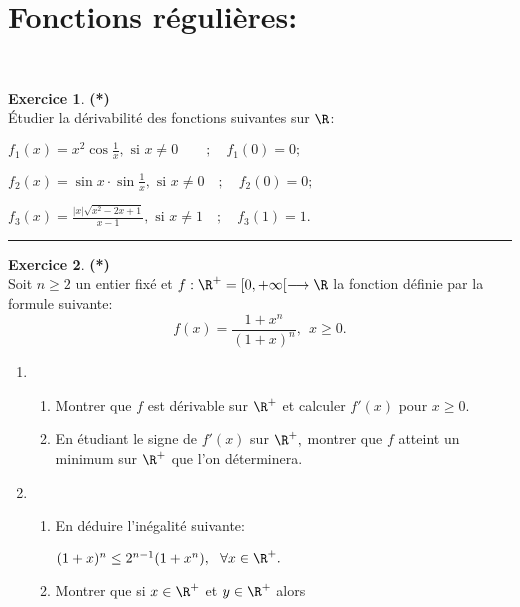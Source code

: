 \documentclass[a4paper,11pt]{article}
\theoremstyle{definition}
\newtheorem{exo}{Exercice} %
\begin{document}
\section*{Fonctions régulières:}\hfill\\%
\begin{minipage}{1\linewidth}
	\begin{minipage}[t]{0.48\linewidth}
		\raggedright
	

\begin{exo}\textbf{(*)}\quad\\[0.2cm]
	\'Etudier la d\'erivabilit\'e des fonctions suivantes sur $\R$:
	
	$f_1(x)=x^2\cos \frac{1}{x}, \text{\ \  si }x\not=0 \qquad ; \quad f_1(0)=0 ;$
	
	$f_2(x)= \sin x \cdot \sin \frac{1}{x}, \text{\ \  si }x\not=0 \quad ; \quad f_2(0)=0 ;$
	
	$f_3(x) = \frac{|x|\sqrt{x^2-2x+1}}{x-1}, \text{\ \  si } x\not= 1 \quad ; \quad f_3(1)=1.$
	
	\centering
	\rule{1\linewidth}{0.6pt}
\end{exo}




\begin{exo}\textbf{(*)}\quad\\[0.2cm]
 	 Soit $n \geq 2$ un entier fix\'e et $f:\R^{+} = [0,
 	+ \infty[ \longrightarrow \R$ la fonction d\'efinie par la formule
 	suivante:\quad\\[-0.3cm]
 	$$ f (x) = \frac{1 + x^n}{(1 + x)^n}, \ \ x \geq 0.$$
 	\begin{enumerate}
 		\item
 		\begin{enumerate}
 			\item Montrer que $f$ est d\'erivable sur $\R^{+}$ et calculer $f' (x)$
 			pour $x \geq 0.$
 			\item En \'etudiant le signe de $f' (x)$ sur $\R^{+},$ montrer que $f$
 			atteint un minimum sur $\R^{+}$ que l'on d\'eterminera.
 		\end{enumerate}
 		\item
 		\begin{enumerate}
 			\item En d\'eduire l'in\'egalit\'e suivante:
 			
 			$ (1+ x)^n \leq 2^{n - 1} (1+ x^n), \ \ \forall x \in \R^{+}.$
 			\item Montrer que si  $x \in \R^{+}$ et $y \in \R^{+}$ alors
 			

\end{enumerate}
\end{enumerate}
\end{exo}
\end{minipage}
\end{minipage}
\end{document}
